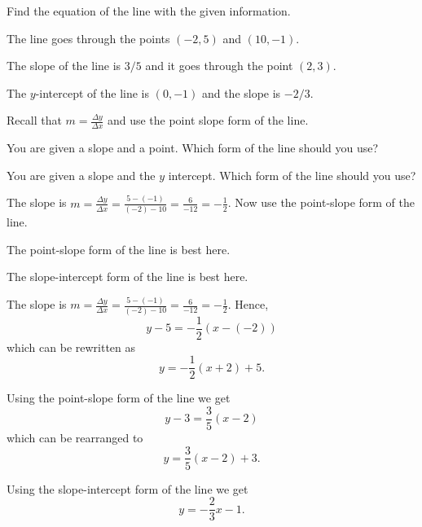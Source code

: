 \begin{activity}\label{A:0.1.2}
Find the equation of the line with the given information.
\ba
\item The line goes through the points $(-2,5)$ and $(10,-1)$.
\item The slope of the line is $3/5$ and it goes through the point $(2,3)$.
\item The $y$-intercept of the line is $(0,-1)$ and the slope is $-2/3$.
\ea

\end{activity}
\begin{smallhint}
   \ba
        \item Recall that $m = \frac{\Delta y}{\Delta x}$ and use the point slope form of
            the line.
        \item You are given a slope and a point.  Which form of the line should you use?
        \item You are given a slope and the $y$ intercept.  Which form of the line should
            you use?
   \ea
\end{smallhint}
\begin{bighint}
   \ba
        \item The slope is $m = \frac{\Delta y}{\Delta x} = \frac{5-(-1)}{(-2)-10} =
            \frac{6}{-12} = -\frac{1}{2}$.  Now use the point-slope form of the line.
        \item The point-slope form of the line is best here.
        \item The slope-intercept form of the line is best here.
   \ea
\end{bighint}
\begin{activitySolution}
   \ba
        \item The slope is $m = \frac{\Delta y}{\Delta x} = \frac{5-(-1)}{(-2)-10} =
            \frac{6}{-12} = -\frac{1}{2}$.  Hence,
            \[ y - 5 = -\frac{1}{2} \left( x-(-2) \right) \]
            which can be rewritten as
            \[ y = -\frac{1}{2} \left( x+2 \right) + 5. \]
        \item Using the point-slope form of the line we get
            \[ y - 3 = \frac{3}{5} \left( x-2 \right) \]
            which can be rearranged to 
            \[ y = \frac{3}{5} \left( x-2 \right) + 3. \]
        \item Using the slope-intercept form of the line we get
            \[ y = -\frac{2}{3} x - 1. \]
   \ea
\end{activitySolution}
\aftera
